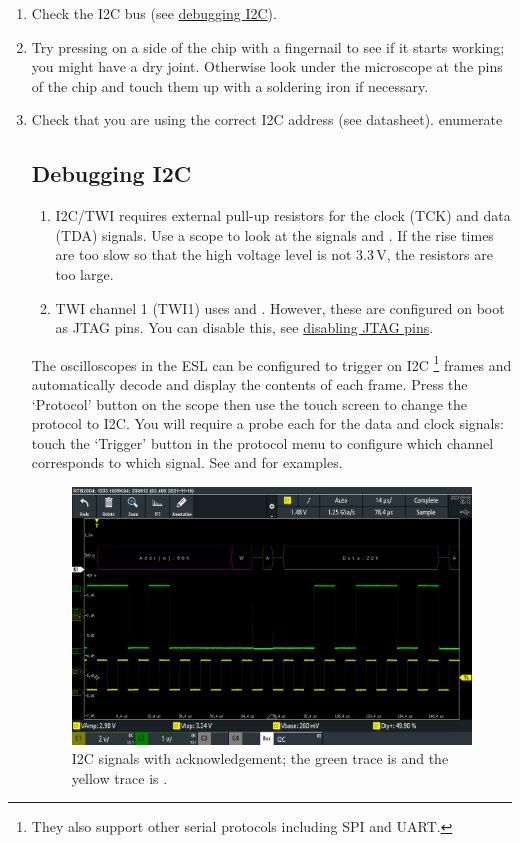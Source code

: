 \begin{enumerate}
\item Check the I2C bus (see \hyperref[debugging-i2c]{debugging I2C}).
\item Try pressing on a side of the chip with a fingernail to see if it
  starts working; you might have a dry joint.  Otherwise look under
  the microscope at the pins of the chip and touch them up with a
  soldering iron if necessary.
\item Check that you are using the correct I2C address (see datasheet).
{enumerate}


\subsection{Debugging I2C}
\label{debugging-i2c}

\begin{enumerate}
\item
  I2C/TWI requires external pull-up resistors for the clock (TCK) and
  data (TDA) signals.  Use a scope to look at the signals
   and .  If the rise times are too slow so
  that the high voltage level is not 3.3\,V, the resistors are too
  large.
\item
  TWI channel 1 (TWI1) uses  and . However, these
  are configured on boot as JTAG pins. You can disable this, see
  \hyperref[disabling-jtag-pins]{disabling JTAG pins}.
\end{enumerate}

The oscilloscopes in the ESL can be configured to trigger on I2C%
\footnote{They also support other serial protocols including SPI and
UART.} frames and automatically decode and display the contents of
each frame. Press the `Protocol' button on the scope then use the
touch screen to change the protocol to I2C. You will require a probe
each for the data and clock signals: touch the `Trigger' button in the
protocol menu to configure which channel corresponds to which signal.
See  and  for examples.

\begin{figure}[!h]
  \centering
  \includegraphics[width=\linewidth]{figs/i2c-ack.png}
  \caption{I2C signals with acknowledgement; the green trace is
   and the yellow trace is .}
  \label{fig:i2c-ack}
\end{figure}



\end{enumerate}
